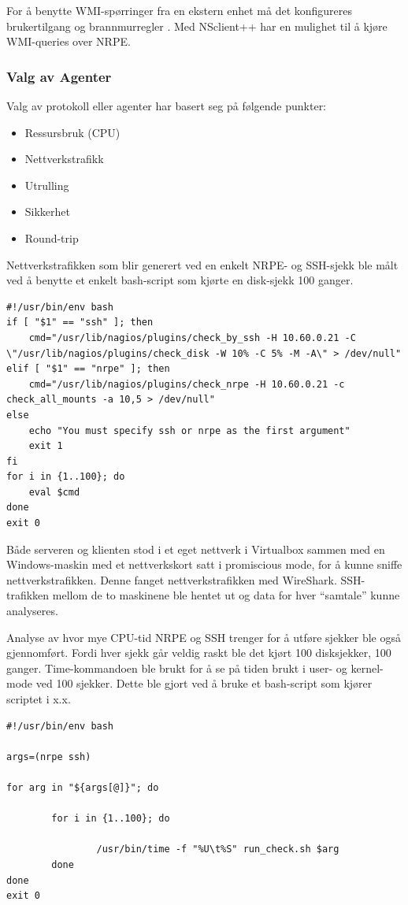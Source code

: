 For å benytte WMI-spørringer fra en ekstern enhet må det konfigureres brukertilgang og brannmurregler \cite{wmiremote}. Med NSclient++ har en mulighet til å kjøre WMI-queries over NRPE.

\subsubsection{Valg av Agenter}
Valg av protokoll eller agenter har basert seg på følgende punkter:
\begin{itemize}
	\item Ressursbruk (CPU)
	\item Nettverkstrafikk
	\item Utrulling
	\item Sikkerhet
	\item Round-trip
\end{itemize}
Nettverkstrafikken som blir generert ved en enkelt NRPE- og SSH-sjekk ble målt ved å benytte et enkelt bash-script som kjørte en disk-sjekk 100 ganger. 

\begin{lstlisting}
#!/usr/bin/env bash
if [ "$1" == "ssh" ]; then
    cmd="/usr/lib/nagios/plugins/check_by_ssh -H 10.60.0.21 -C \"/usr/lib/nagios/plugins/check_disk -W 10% -C 5% -M -A\" > /dev/null"
elif [ "$1" == "nrpe" ]; then
    cmd="/usr/lib/nagios/plugins/check_nrpe -H 10.60.0.21 -c check_all_mounts -a 10,5 > /dev/null"
else
    echo "You must specify ssh or nrpe as the first argument"
    exit 1
fi
for i in {1..100}; do
    eval $cmd
done
exit 0
\end{lstlisting}

Både serveren og klienten stod i et eget nettverk i Virtualbox sammen med en Windows-maskin med et nettverkskort satt i promiscious mode, for å kunne sniffe nettverkstrafikken. Denne fanget nettverkstrafikken med WireShark. SSH-trafikken mellom de to maskinene ble hentet ut og data for hver “samtale” kunne analyseres.  

Analyse av hvor mye CPU-tid NRPE og SSH trenger for å utføre sjekker ble også gjennomført. Fordi hver sjekk går veldig raskt ble det kjørt 100 disksjekker, 100 ganger. Time-kommandoen ble brukt for å se på tiden brukt i user- og kernel-mode ved 100 sjekker. Dette ble gjort ved å bruke et bash-script som kjører scriptet i x.x.

\begin{lstlisting}
#!/usr/bin/env bash

args=(nrpe ssh)

for arg in "${args[@]}"; do

        for i in {1..100}; do

                /usr/bin/time -f "%U\t%S" run_check.sh $arg
        done
done
exit 0
\end{lstlisting}

